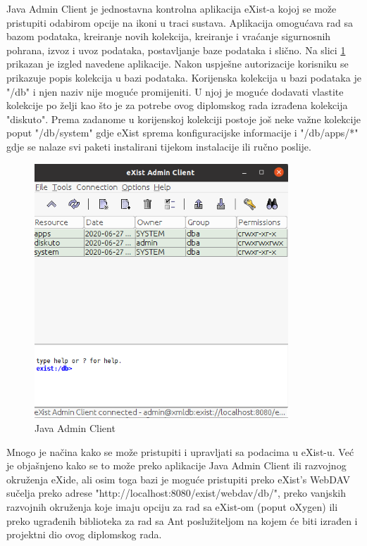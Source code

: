 \documentclass{foi}
\begin{document}
Java Admin Client je jednostavna kontrolna aplikacija eXist-a kojoj se može pristupiti odabirom opcije na ikoni u traci sustava. Aplikacija omogućava rad sa bazom podataka, kreiranje novih kolekcija, kreiranje i vraćanje sigurnosnih pohrana, izvoz i uvoz podataka, postavljanje baze podataka i slično. Na slici \ref{javaAdminClient} prikazan je izgled navedene aplikacije. Nakon uspješne autorizacije korisniku se prikazuje popis kolekcija u bazi podataka. Korijenska kolekcija u bazi podataka je "/db" i njen naziv nije moguće promijeniti. U njoj je moguće dodavati vlastite kolekcije po želji kao što je za potrebe ovog diplomskog rada izrađena kolekcija "diskuto". Prema zadanome u korijenskoj kolekciji postoje još neke važne kolekcije poput "/db/system" gdje eXist sprema konfiguracijske informacije i "/db/apps/*" gdje se nalaze svi paketi instalirani tijekom instalacije ili ručno poslije.

\begin{figure}[h!]
    \centering
    \includegraphics[width=0.85\textwidth]{slike/javaAdminClient.png}
    \caption{Java Admin Client}
    \label{javaAdminClient}
\end{figure}

Mnogo je načina kako se može pristupiti i upravljati sa podacima u eXist-u. Već je objašnjeno kako se to može preko aplikacije Java Admin Client ili razvojnog okruženja eXide, ali osim toga bazi je moguće pristupiti preko  eXist's WebDAV sučelja preko adrese "http://localhost:8080/exist/webdav/db/", preko vanjskih razvojnih okruženja koje imaju opciju za rad sa eXist-om (poput oXygen) ili preko ugrađenih biblioteka za rad sa Ant poslužiteljom na kojem će biti izrađen i projektni dio ovog diplomskog rada.
\end{document}
